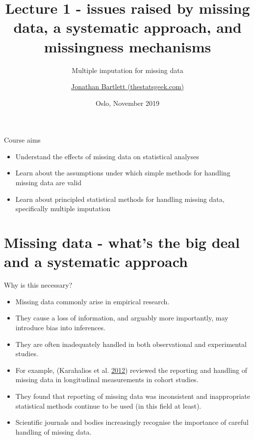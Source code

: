 \documentclass[ignorenonframetext,]{beamer}
\title{Lecture 1 - issues raised by missing data, a systematic approach, and
missingness mechanisms}
\subtitle{Multiple imputation for missing data}
\author{\href{https://thestatsgeek.com}{Jonathan Bartlett (thestatsgeek.com)}}
\date{Oslo, November 2019}
\providecommand{\tightlist}{%
  \setlength{\itemsep}{0pt}\setlength{\parskip}{0pt}}
\begin{document}
\frame{\titlepage}

\begin{frame}
\tableofcontents[hideallsubsections]
\end{frame}
\begin{frame}{Course aims}
\protect\hypertarget{course-aims}{}

\begin{itemize}
\tightlist
\item
  Understand the effects of missing data on statistical analyses
\item
  Learn about the assumptions under which simple methods for handling
  missing data are valid
\item
  Learn about principled statistical methods for handling missing data,
  specifically multiple imputation
\end{itemize}

\end{frame}

\hypertarget{missing-data---whats-the-big-deal-and-a-systematic-approach}{%
\section{Missing data - what's the big deal and a systematic
approach}\label{missing-data---whats-the-big-deal-and-a-systematic-approach}}

\begin{frame}{Why is this necessary?}
\protect\hypertarget{why-is-this-necessary}{}

\begin{itemize}
\tightlist
\item
  Missing data commonly arise in empirical research.
\item
  They cause a loss of information, and arguably more importantly, may
  introduce bias into inferences.
\item
  They are often inadequately handled in both observational and
  experimental studies.
\item
  For example, (Karahalios et al.
  \protect\hyperlink{ref-karahalios2012review}{2012}) reviewed the
  reporting and handling of missing data in longitudinal measurements in
  cohort studies.
\item
  They found that reporting of missing data was inconsistent and
  inappropriate statistical methods continue to be used (in this field
  at least).
\item
  Scientific journals and bodies increasingly recognise the importance
  of careful handling of missing data.
\end{itemize}

\end{frame}
\end{document}

